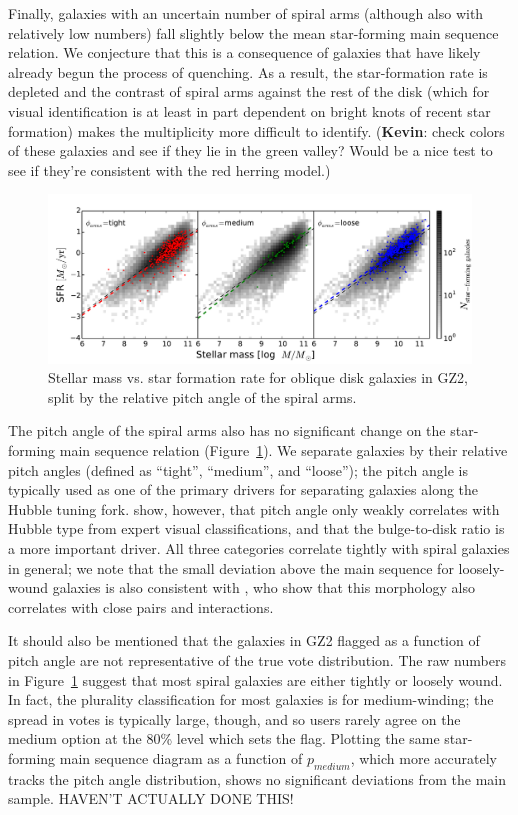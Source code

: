 \documentclass{emulateapj}
\newcommand{\kevin}{{\color{red}\textbf{Kevin}}}
\begin{document}
Finally, galaxies with an uncertain number of spiral arms (although also with relatively low numbers) fall slightly below the mean star-forming main sequence relation. We conjecture that this is a consequence of galaxies that have likely already begun the process of quenching. As a result, the star-formation rate is depleted and the contrast of spiral arms against the rest of the disk (which for visual identification is at least in part dependent on bright knots of recent star formation) makes the multiplicity more difficult to identify. (\kevin: check colors of these galaxies and see if they lie in the green valley? Would be a nice test to see if they're consistent with the red herring model.)

\begin{figure}
\includegraphics[angle=0,width=7.0in]{figures/ms_arms_winding.pdf}
\caption{Stellar mass vs. star formation rate for oblique disk galaxies in GZ2, split by the relative pitch angle of the spiral arms. 
\label{fig-winding}}
\end{figure}

The pitch angle of the spiral arms also has no significant change on the star-forming main sequence relation (Figure~\ref{fig-winding}). We separate galaxies by their relative pitch angles (defined as ``tight'', ``medium'', and ``loose''); the pitch angle is typically used as one of the primary drivers for separating galaxies along the Hubble tuning fork. \citet{wil13} show, however, that pitch angle only weakly correlates with Hubble type from expert visual classifications, and that the bulge-to-disk ratio is a more important driver. All three categories correlate tightly with spiral galaxies in general; we note that the small deviation above the main sequence for loosely-wound galaxies is also consistent with \citet{cas13}, who show that this morphology also correlates with close pairs and interactions. 

It should also be mentioned that the galaxies in GZ2 flagged as a function of pitch angle are not representative of the true vote distribution. The raw numbers in Figure~\ref{fig-winding} suggest that most spiral galaxies are either tightly or loosely wound. In fact, the plurality classification for most galaxies is for medium-winding; the spread in votes is typically large, though, and so users rarely agree on the medium option at the 80\% level which sets the flag. Plotting the same star-forming main sequence diagram as a function of $p_{medium}$, which more accurately tracks the pitch angle distribution, shows no significant deviations from the main sample. {\color{red}HAVEN'T ACTUALLY DONE THIS!}
\end{document}
